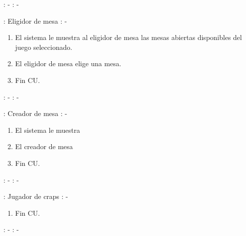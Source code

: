 : - \newline
\indent{}: -

: Eligidor de mesa \newline
\indent{}: -

\begin{enumerate}
\item El sistema le muestra al eligidor de mesa las mesas abiertas disponibles del juego seleccionado.
\item El eligidor de mesa elige una mesa.
\item Fin CU.
\end{enumerate}



: - \newline
\indent{}: -

: Creador de mesa \newline
\indent{}: -

\begin{enumerate}
\item El sistema le muestra
\item El creador de mesa 
\item Fin CU.
\end{enumerate}



: - \newline
\indent{}: -

: Jugador de craps \newline
\indent{}: -

\begin{enumerate}
\item Fin CU.
\end{enumerate}



: - \newline
\indent{}: -

